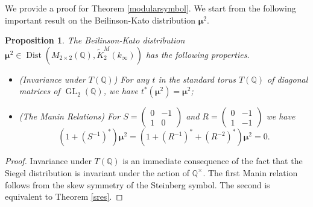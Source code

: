 \documentclass[12pt,amstex,amssymb]{article}
\theoremstyle{plain}
\newtheorem{proposition}[theorem]{Proposition}
\theoremstyle{definition}
\def\cS{{\cal S}}
\def\A{{\mathbb A}}
\def\Q{{\mathbb Q}}
\newcommand{\bea}{\begin{eqnarray}}
\newcommand{\eea}{\end{eqnarray}}
\newcommand{\GL}{\operatorname{GL}}
\newcommand{\Dist}{\operatorname{Dist}}
\begin{document}





We provide a proof for Theorem \ref{modularsymbol}.
We start from the following important result on the Beilinson-Kato distribution ${{\bm\mu}^2}$.
\begin{proposition}\label{wdefined}
The Beilinson-Kato distribution ${{\bm\mu}^2} \in \Dist(M_{2\times2}(\Q),\tilde K^M_2(k_\infty))$ has the following properties.
\begin{itemize}
\item[(a)] (Invariance under $T(\Q)$)  For any $t$ in the standard torus $T(\Q)$ of diagonal matrices of $\GL_2(\Q)$, we have $t^*({{\bm\mu}^2}) = {{\bm\mu}^2}$;

\item[(b)] (The Manin Relations)   For $S = \begin{pmatrix}0&-1\\ 1&0\end{pmatrix}$ and $R = \begin{pmatrix}0&-1\\ 1&-1\end{pmatrix}$ we have
$$
(1 + (S^{-1})^*){{\bm\mu}^2} = (1+(R^{-1})^* +(R^{-2})^*){{\bm\mu}^2} = 0.
$$
\end{itemize}

\end{proposition}


\begin{proof}  Invariance under $T(\Q)$ is an immediate consequence of the fact that the Siegel distribution is invariant under the action of $\Q^\times$.   The first Manin relation follows from the skew symmetry of the Steinberg symbol.  The second is equivalent to Theorem  \ref{sres}. 
\end{proof}
\end{document}
